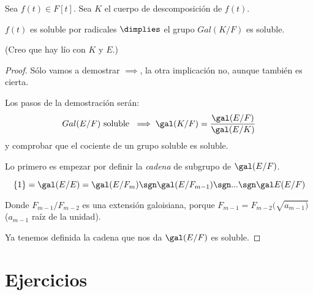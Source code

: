 \documentclass{apuntes}
\begin{document}
\begin{theorem}
\label{TmaResolubilidadRadicales}
Sea $f(t) ∈ F[t]$. Sea $K$ el cuerpo de descomposición de $f(t)$.

$f(t)$ es soluble por radicales $\dimplies$ el grupo $Gal(K/F)$ es soluble.
\end{theorem}
(Creo que hay lío con $K$ y $E$.)
\begin{proof}
Sólo vamos a demostrar $\implies$, la otra implicación no, aunque también es cierta.

Los pasos de la demostración serán: $$Gal(E/F)  \text{ soluble }\implies \gal(K/F)=\frac{\gal(E/F)}{\gal(E/K)}$$
y comprobar que el cociente de un grupo  soluble es soluble.


Lo primero es empezar por definir la \textit{cadena }de subgrupo de $\gal(E/F)$.

$$\{1\} = \gal(E/E) = \gal(E/F_m) \sgn \gal(E/F_{m-1}) \sgn ... \sgn \gal E(E/F)$$

Donde $F_{m-1} / F_{m-2}$ es una extensión galoisiana, porque $F_{m-1} = F_{m-2}(\sqrt{a_{m-1})}$ ($a_{m-1}$ raíz de la unidad).

Ya tenemos definida la cadena que nos da $\gal(E/F)$ es soluble.



\end{proof}


\appendix
\chapter{Ejercicios}



\printindex
\end{document}
